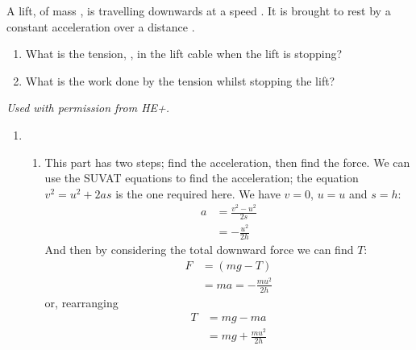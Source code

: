 

\begin{problem}[HE+_Lift]%
{A lift, of  mass , is travelling downwards at a speed . It is brought to rest by a constant acceleration over a distance . 
\begin{enumerate} 
	\item What is the tension, , in the lift cable when the lift is stopping?
	\item What is the work done by the tension whilst stopping the lift?
\end{enumerate}
}
{\textit{Used with permission from HE+.}}
{\begin{enumerate}
\item
\begin{enumerate}
	\item This part has two steps; find the acceleration, then find the force. We can use the SUVAT equations to find the acceleration; the equation $v^{2} = u^{2} + 2as$ is the one required here. We have $v = 0$, $u = u$ and $s = h$:
\begin{align*} a &= \frac{v^{2} - u^{2}}{2s} \\ &= -\frac{u^{2}}{2h} \end{align*}
And then by considering the total downward force we can find $T$:
\begin{align*} F &= (mg - T) \\ &= ma = -\frac{mu^{2}}{2h} \end{align*}
or, rearranging \begin{align*} T &= mg - ma \\ &= mg + \frac{mu^{2}}{2h} \end{align*}

\end{enumerate}
\end{enumerate}}
\end{problem}
